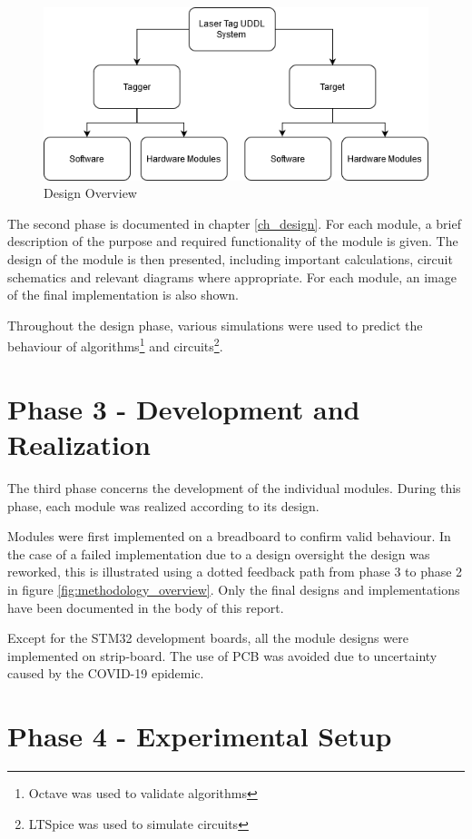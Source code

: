 \begin{figure}[H]
	\centering
	\includegraphics[width=0.7\linewidth]{figures/methodology/design_overview}
	\caption{Design Overview}
	\label{fig:designoverview}
\end{figure}

The second phase is documented in chapter \ref{ch_design}. For each module, a brief description of the purpose and required functionality of the module is given. The design of the module is then presented, including important calculations, circuit schematics and relevant diagrams where appropriate. For each module, an image of the final implementation is also shown.

Throughout the design phase, various simulations were used to predict the behaviour of algorithms\footnote{Octave was used to validate algorithms} and circuits\footnote{LTSpice was used to simulate circuits}.


\section{Phase 3 - Development and Realization}

The third phase concerns the development of the individual modules. During this phase, each module was realized according to its design.

Modules were first implemented on a breadboard to confirm valid behaviour. In the case of a failed implementation due to a design oversight the design was reworked, this is illustrated using a dotted feedback path from phase 3 to phase 2 in figure \ref{fig:methodology_overview}. Only the final designs and implementations have been documented in the body of this report.

Except for the STM32 development boards, all the module designs were implemented on strip-board. The use of PCB was avoided due to uncertainty caused by the COVID-19 epidemic.



\section{Phase 4 - Experimental Setup}

